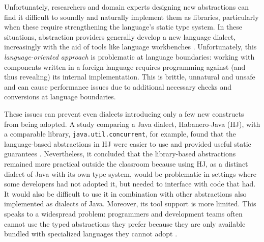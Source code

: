 \documentclass[9pt,preprint]{sigplanconf}
\newcommand{\lstinlinep}[1]{\lstinline[language=Python,basicstyle=\ttfamily\small]{#1}}
\begin{document}
Unfortunately, researchers and domain experts designing new abstractions can  find it difficult to soundly and naturally implement them as libraries, particularly when these require strengthening the language's static type system. In these situations, abstraction providers generally develop a new language dialect, increasingly with the aid of tools like language workbenches \cite{erdweg2013state}. Unfortunately, this \emph{language-oriented approach} \cite{journals/stp/Ward94} is problematic at language boundaries: working with components written in a foreign language requires programming against (and thus revealing) its internal implementation. This is brittle, unnatural and unsafe and can cause performance issues due to additional necessary checks and conversions at language boundaries. %

These issues can prevent even dialects introducing only a few new constructs from being adopted. A study comparing a Java dialect, Habanero-Java (HJ), with a comparable library, \lstinlinep{java.util.concurrent}, for example, found that the language-based abstractions in HJ were easier to use and provided useful static guarantees \cite{cave2010comparing}. Nevertheless, it concluded that the library-based abstractions remained more practical outside the classroom because using HJ, as a distinct dialect of Java with its own type system, would be problematic in settings where some developers had not adopted it, but needed to interface with code that had. It would also be difficult to use it in combination with other abstractions also implemented as dialects of Java. Moreover, its tool support is more limited. 
This speaks to a widespread problem: programmers and development teams often cannot use  the typed abstractions they prefer because they are only available bundled with specialized languages they cannot  adopt \cite{Meyerovich:2012:SDR:2414721.2414724,Meyerovich:2013:EAP:2509136.2509515}. %

\end{document}
